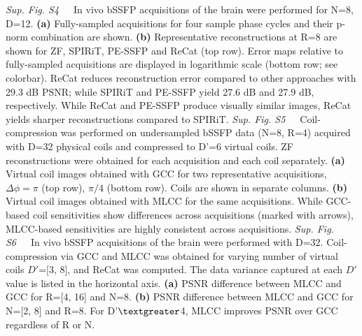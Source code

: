 \documentclass[11pt, onecolumn]{article}
\begin{document}
{\newline\textit{Sup. Fig. S4}~~~In vivo bSSFP acquisitions of the brain were performed for N=8, D=12. \textbf{(a)} Fully-sampled acquisitions for four sample phase cycles and their p-norm combination are shown. \textbf{(b)} Representative reconstructions at R=8 are shown for ZF, SPIRiT, PE-SSFP and ReCat (top row). Error maps relative to fully-sampled acquisitions are displayed in logarithmic scale (bottom row; see colorbar). ReCat reduces reconstruction error compared to other approaches with 29.3 dB PSNR; while SPIRiT and PE-SSFP yield 27.6 dB and 27.9 dB, respectively. While ReCat and PE-SSFP produce visually similar images, ReCat yields sharper reconstructions compared to SPIRiT.\dotfill}
{\newline\textit{Sup. Fig. S5}~~~Coil-compression was performed on undersampled bSSFP data (N=8, R=4) acquired with D=32 physical coils and compressed to D'=6 virtual coils. ZF reconstructions were obtained for each acquisition and each coil separately. \textbf{(a)} Virtual coil images obtained with GCC for two representative acquisitions, $\Delta \phi = \pi$ (top row), $\pi/4$ (bottom row). Coils are shown in separate columns. \textbf{(b)} Virtual coil images obtained with MLCC for the same acquisitions. While GCC-based coil sensitivities show differences across acquisitions (marked with arrows), MLCC-based sensitivities are highly consistent across acquisitions.\dotfill}
{\newline\textit{Sup. Fig. S6}~~~In vivo bSSFP acquisitions of the brain were performed with D=32. Coil-compression via GCC and MLCC was obtained for varying number of virtual coils $D'$=[3, 8], and ReCat was computed. The data variance captured at each $D'$ value is listed in the horizontal axis. \textbf{(a)} PSNR difference between MLCC and GCC for R=[4, 16] and N=8. \textbf{(b)} PSNR difference between MLCC and GCC for N=[2, 8] and R=8. For D'$\textgreater$4, MLCC improves PSNR over GCC regardless of R or N.\dotfill}
\end{document}
